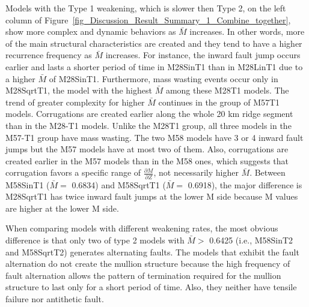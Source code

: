 Models with the Type 1 weakening, which is slower then Type 2, on the left column of Figure~\hyperref[fig_Discussion_Result_Summary_1_Combine_together]{\ref{fig_Discussion_Result_Summary_1_Combine_together}}, show more complex and dynamic behaviors as $\bar{M}$ increases. In other words, more of the main structural characteristics are created and they tend to have a higher recurrence frequency as $\bar{M}$ increases. %
%
For instance, %
the inward fault jump occurs earlier and lasts a shorter period of time in M28SinT1 than in M28LinT1 due to a higher $\bar{M}$ of M28SinT1. Furthermore, mass wasting events occur only in M28SqrtT1, the model with the highest $\bar{M}$ among these M28T1 models. 
The trend of greater complexity for higher $\bar{M}$ continues in the group of M57T1 models. Corrugations are created earlier along the whole 20 km ridge segment than in the M28-T1 models. Unlike the M28T1 group, all three models in the M57-T1 group have mass wasting. %
The two M58 models have 3 or 4 inward fault jumps but the M57 models have at most two of them. Also, corrugations are created earlier in the M57 models than in the M58 ones, which suggests that corrugation favors a specific range of $\frac{\partial M}{\partial Z}$, not necessarily higher $\bar{M}$. Between M58SinT1 ($\bar{M} =$ 0.6834) and M58SqrtT1 ($\bar{M} =$ 0.6918), the major difference is M28SqrtT1 has twice inward fault jumps at the lower M side because M values are higher at the lower M side.

When comparing models with different weakening rates, the most obvious difference is that only two of type 2 models with $\bar{M} >$ 0.6425 (i.e., M58SinT2 and M58SqrtT2) generates alternating faults. The models that exhibit the fault alternation do not create the mullion structure because the high frequency of fault alternation allows the pattern of termination required for the mullion structure to last only for a short period of time. Also, they neither have tensile failure nor antithetic fault.

